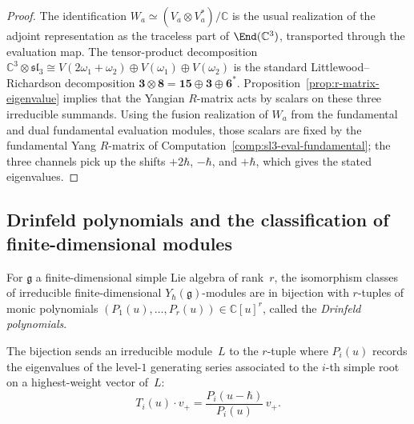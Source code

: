 \begin{proof}
The identification
$W_a\simeq (V_a\otimes V_a^*)/\mathbb C$ is the usual realization of
the adjoint representation as the traceless part of
$\End(\mathbb C^3)$, transported through the evaluation map.
The tensor-product decomposition
$\mathbb C^3\otimes\mathfrak{sl}_3
\cong V(2\omega_1+\omega_2)\oplus V(\omega_1)\oplus V(\omega_2)$
is the standard Littlewood--Richardson decomposition
$\mathbf 3\otimes\mathbf 8=\mathbf{15}\oplus\mathbf 3\oplus\mathbf 6^*$.
Proposition~\ref{prop:r-matrix-eigenvalue} implies that the Yangian
$R$-matrix acts by scalars on these three irreducible summands.
Using the fusion realization of $W_a$ from the fundamental and dual
fundamental evaluation modules, those scalars are fixed by the
fundamental Yang $R$-matrix of
Computation~\ref{comp:sl3-eval-fundamental}; the three channels pick up
the shifts $+2\hbar$, $-\hbar$, and $+\hbar$, which gives the stated
eigenvalues.
\end{proof}

\subsection{Drinfeld polynomials and the classification of finite-dimensional modules}

\begin{theorem}
\label{thm:drinfeld-classification}
For $\mathfrak{g}$ a finite-dimensional simple Lie algebra
of rank~$r$, the isomorphism classes of irreducible
finite-dimensional $Y_\hbar(\mathfrak{g})$-modules are in
bijection with $r$-tuples of monic polynomials
$(P_1(u),\dots,P_r(u))\in\mathbb{C}[u]^r$, called the
\emph{Drinfeld polynomials}.

The bijection sends an irreducible module~$L$ to the
$r$-tuple where $P_i(u)$ records the eigenvalues of the
level-$1$ generating series associated to the $i$-th simple
root on a highest-weight vector of~$L$:
\[
T_i(u)\cdot v_+
=
\frac{P_i(u-\hbar)}{P_i(u)}\,v_+.
\]
\end{theorem}

